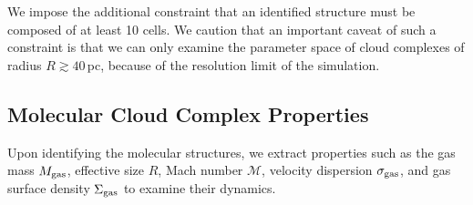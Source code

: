 \IfFileExists{emulateapjlegacy.cls}{\documentclass[iop]{emulateapjlegacy}}{\documentclass[iop]{emulateapj}}
\begin{document}
We impose the additional constraint that an identified structure must be composed of at least 10 cells. We caution that an important caveat of such a constraint is that we can only examine the parameter space of cloud complexes of radius $R\gtrsim 40$\,pc, because of the resolution limit of the simulation.

\subsection{Molecular Cloud Complex Properties} \label{sec:distribution}

Upon identifying the molecular structures, we extract properties such as the gas mass $M_{\rm gas}$, effective size $R$, Mach number
$\mathcal{M}$, velocity dispersion $\sigma_{\rm gas}$, and gas surface density $\Sigma_{\rm gas}$ to examine their dynamics.
\end{document}
